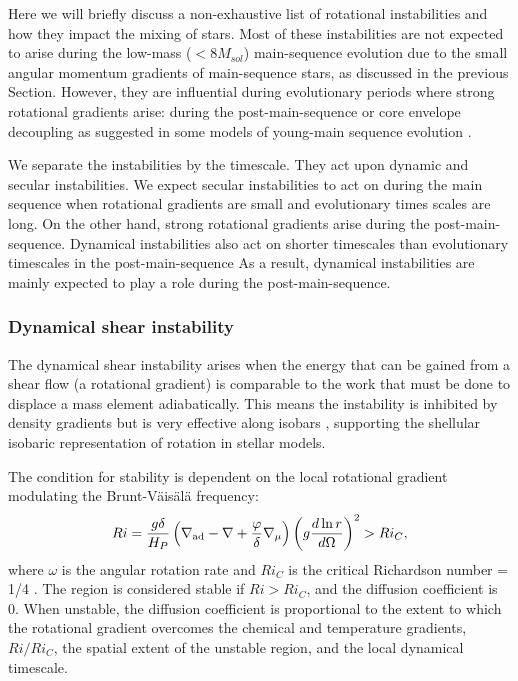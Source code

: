 Here we will briefly discuss a non-exhaustive list of rotational instabilities and how they impact the mixing of stars.
Most of these instabilities are not expected to arise during the low-mass ($<$8$M_{sol}$) main-sequence evolution due to the small angular momentum gradients of main-sequence stars, as discussed in the previous Section.
However, they are influential during evolutionary periods where strong rotational gradients arise: during the post-main-sequence or core envelope decoupling as suggested in some models of young-main sequence evolution \citep{heger_presupernova_2000}.


We separate the instabilities by the timescale. 
They act upon dynamic and secular instabilities.
We expect secular instabilities to act on during the main sequence when rotational gradients are small and evolutionary times scales are long.
On the other hand, strong rotational gradients arise during the post-main-sequence.
Dynamical instabilities also act on shorter timescales than evolutionary timescales in the post-main-sequence
As a result, dynamical instabilities are mainly expected to play a role during the post-main-sequence.

\subsubsection{Dynamical shear instability}

The dynamical shear instability arises when the energy that can be gained from a shear flow (a rotational gradient) is comparable to the work that must be done to displace a mass element adiabatically. 
This means the instability is inhibited by density gradients but is very effective along isobars \citep{endal_evolution_1978,pinsonneault_evolutionary_1989,heger_presupernova_1998}, supporting the shellular isobaric representation of rotation in stellar models.

The condition for stability is dependent on the local rotational gradient modulating the Brunt-V\"{a}is\"{a}l\"{a} frequency:
\begin{equation}
    Ri = \frac{g \delta}{H_P}\left(\nabla_{\textnormal{ad}} - \nabla + \frac{\varphi}{\delta}\nabla_{\mu}\right)\left(g \frac{d \ln r}{d \Omega}\right)^2 > Ri_C,
    \label{eqn:richoooo}
\end{equation}
where $\omega$ is the angular rotation rate and $Ri_C$ is the critical Richardson number = 1/4 \citep{zahn_rotational_1974}. 
The region is considered stable if $Ri>Ri_C$, and the diffusion coefficient is 0.
When unstable, the diffusion coefficient is proportional to the extent to which the rotational gradient overcomes the chemical and temperature gradients, $Ri/Ri_C$, the spatial extent of the unstable region, and the local dynamical timescale.

